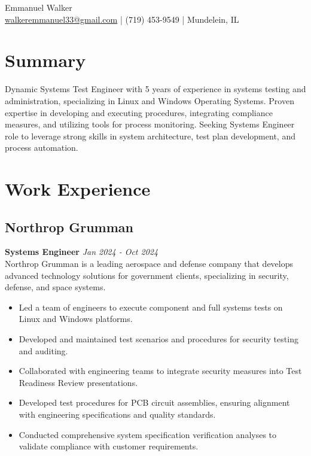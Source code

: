 \documentclass[a4paper,10pt]{article}
\begin{document}
\begin{center}
    {\LARGE Emmanuel Walker} \\[5pt]
    \href{mailto:walkeremmanuel33@gmail.com}{walkeremmanuel33@gmail.com} | (719) 453-9549 | Mundelein, IL %
\end{center}

\section{Summary}
Dynamic Systems Test Engineer with 5 years of experience in systems testing and administration, specializing in Linux
and Windows Operating Systems. Proven expertise in developing and executing procedures, integrating compliance
measures, and utilizing tools for process monitoring. Seeking Systems Engineer role to leverage strong skills in system
architecture, test plan development, and process automation.
\section{Work Experience}

\subsection{Northrop Grumman}
\noindent\textbf{Systems Engineer} \hfill \textit{Jan 2024 - Oct 2024} \\
Northrop Grumman is a leading aerospace and defense company that develops advanced technology solutions for government clients, specializing in security, defense, and space systems.
\begin{itemize}[leftmargin=*]
    \item Led a team of engineers to execute component and full systems tests on Linux and Windows platforms.
    \item Developed and maintained test scenarios and procedures for security testing and auditing.
    \item Collaborated with engineering teams to integrate security measures into Test Readiness Review presentations.
    \item Developed test procedures for PCB circuit assemblies, ensuring alignment with engineering specifications and quality standards.
    \item Conducted comprehensive system specification verification analyses to validate compliance with customer requirements.
\end{itemize}
\end{document}
